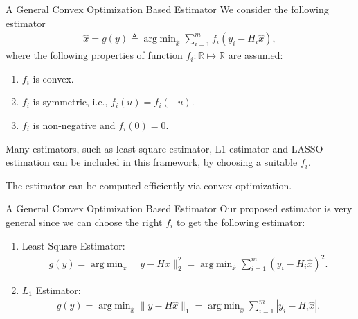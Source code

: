 \documentclass[10pt]{beamer}
\DeclareMathOperator{\argmin}{arg\;min}
\begin{document}
\begin{frame}{A General Convex Optimization Based Estimator}
  We consider the following estimator
  \begin{align*}
    \hat x = g(y) \triangleq \argmin_{\hat x} \sum_{i=1}^m f_i(y_i-H_i \hat x),
  \end{align*}
  where the following properties of function $f_i:\mathbb R\mapsto \mathbb R$ are assumed:
  \begin{enumerate}
    \item $f_i$ is convex.
    \item $f_i$ is symmetric, i.e., $f_i(u) = f_i(-u)$.
    \item $f_i$ is non-negative and $f_i(0) = 0$.
  \end{enumerate} 

  Many estimators, such as least square estimator, L1 estimator and LASSO estimation can be included in this framework, by choosing a suitable $f_i$.

  The estimator can be computed efficiently via convex optimization. 
\end{frame}

\begin{frame}{A General Convex Optimization Based Estimator}
  Our proposed estimator is very general since we can choose the right $f_i$ to get the following estimator:
  \begin{enumerate}
  \item Least Square Estimator:
    \begin{align*}
      g(y) = \argmin_{\hat x} \|y-H\hat x\|_2^2= \argmin_{\hat x}  \sum_{i=1}^m (y_i-H_i\hat x)^2.
    \end{align*}
  \item $L_1$ Estimator:
    \begin{align*}
      g(y) = \argmin_{\hat x} \|y-H\hat x\|_1=\argmin_{\hat x} \sum_{i=1}^m |y_i-H_i\hat x|.
    \end{align*}
  \end{enumerate}
\end{frame}
\end{document}
